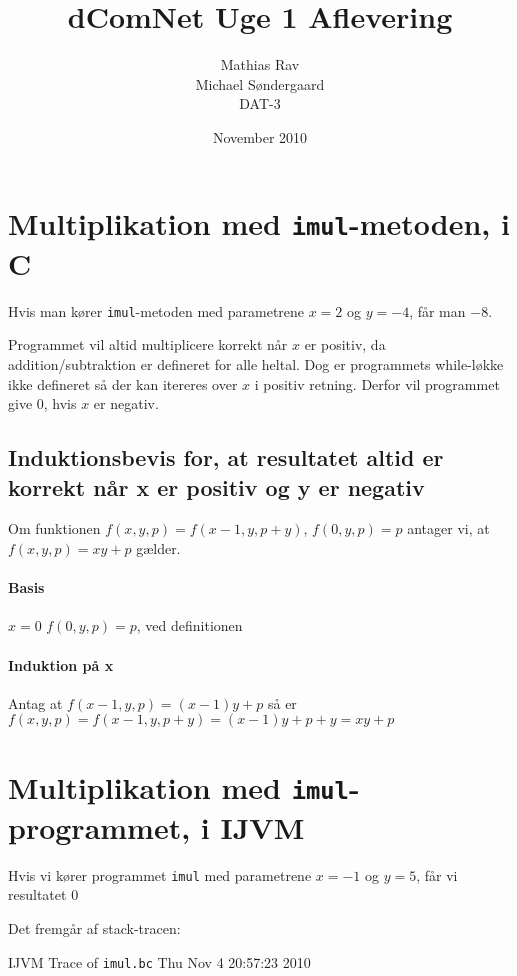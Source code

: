 \documentclass[12pt,a4paper]{article}
\newcommand{\imul}{\texttt{imul}}
\begin{document}
\title{dComNet Uge 1 Aflevering}
\author{Mathias Rav \\
		Michael Søndergaard \\
		DAT-3}
\date{November 2010}
\maketitle

\section{Multiplikation med \imul{}-metoden, i C}
Hvis man kører \imul{}-metoden med parametrene $x=2$ og $y=-4$, får man $-8$.

Programmet vil altid multiplicere korrekt når $x$ er positiv, da addition/subtraktion er defineret for alle heltal.
Dog er programmets while-løkke ikke defineret så der kan itereres over $x$ i positiv retning.
Derfor vil programmet give 0, hvis $x$ er negativ.

\subsection{Induktionsbevis for, at resultatet altid er korrekt når x er positiv og y er negativ}

Om funktionen $f(x, y, p) = f(x-1, y, p+y)$, $f(0, y, p) = p$ antager vi, at $f(x, y, p) = xy+p$ gælder.
\paragraph{Basis} $x = 0$
$f(0, y, p) = p$, ved definitionen
\paragraph{Induktion på x}
Antag at $f(x-1, y, p) = (x-1)y+p$
så er $f(x, y, p) = f(x-1, y, p+y) = (x-1)y+p+y = xy+p$



\section{Multiplikation med \imul{}-programmet, i IJVM}
Hvis vi kører programmet \imul{} med parametrene $x=-1$ og $y=5$, får vi resultatet $0$

Det fremgår af stack-tracen:

IJVM Trace of \texttt{imul.bc} Thu Nov  4 20:57:23 2010
\end{document}
